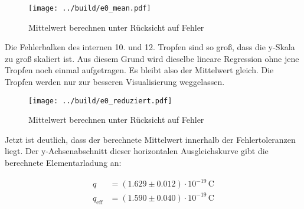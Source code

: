 \begin{figure*}
    \texttt{[image: ../build/e0\_mean.pdf]}
    \caption{Mittelwert berechnen unter Rücksicht auf Fehler}
\end{figure*}

\noindent Die Fehlerbalken des internen 10. und 12. Tropfen sind so groß, dass die y-Skala zu groß skaliert ist. Aus diesem Grund wird 
dieselbe lineare Regression ohne jene Tropfen noch einmal aufgetragen. Es bleibt also der Mittelwert gleich. Die Tropfen werden nur zur 
besseren Visualisierung weggelassen.

\begin{figure*}
    \texttt{[image: ../build/e0\_reduziert.pdf]}
    \caption{Mittelwert berechnen unter Rücksicht auf Fehler}
\end{figure*}

\noindent Jetzt ist deutlich, dass der berechnete Mittelwert innerhalb der Fehlertoleranzen liegt. Der y-Achsenabschnitt dieser horizontalen 
Ausgleichskurve gibt die berechnete Elementarladung an:

\begin{align*}
    q            &= \left(1.629\pm0.012\right)\cdot10^{-19}\,\unit{\coulomb} \\
    q_\text{eff} &= \left(1.590 \pm0.040\right)\cdot10^{-19}\,\unit{\coulomb} 
\end{align*}




